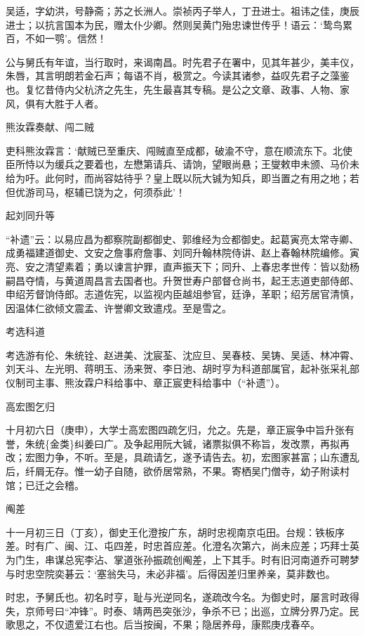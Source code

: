 \documentclass[]{article}
\begin{document}
吴适，字幼洪，号静斋；苏之长洲人。崇祯丙子举人，丁丑进士。祖讳之佳，庚辰进士；以抗言国本为民，赠太仆少卿。然则吴黄门殆忠谏世传乎！语云：`鸷鸟累百，不如一鹗'。信然！

公与舅氏有年谊，当行取时，来谒南昌。时先君子在署中，见其年甚少，美丰仪，朱唇，其言明朗若金石声；每语不肖，极赏之。今读其诸参，益叹先君子之藻鉴也。复忆昔侍内父杭济之先生，先生最喜其专稿。是公之文章、政事、人物、家风，俱有大胜于人者。

熊汝霖奏献、闯二贼

吏科熊汝霖言：`献贼已至重庆、闯贼直至成都，破渝不守，意在顺流东下。北使臣所恃以为缓兵之要着也，左懋第请兵、请饷，望眼尚悬；王燮敕申未颁、马价未给为吁。此何时，而尚容姑待乎？皇上既以阮大铖为知兵，即当置之有用之地；若但优游司马，枢辅已饶为之，何须忝此'！

起刘同升等

``补遗''云：以易应昌为都察院副都御史、郭维经为佥都御史。起葛寅亮太常寺卿、成勇福建道御史、文安之詹事府詹事、刘同升翰林院侍讲、赵上春翰林院编修。寅亮、安之清望素着；勇以谏言护罪，直声振天下；同升、上春忠孝世传：皆以劾杨嗣昌夺情，与黄道周昌言去国者也。升贺世寿户部督仓尚书，起王志道吏部侍郎、申绍芳督饷侍郎。志道佐宪，以监视内臣越俎参官，廷诤，革职；绍芳居官清慎，因温体仁欲倾文震孟、许誉卿文致遣戍。至是雪之。

考选科道

考选游有伦、朱统铨、赵进美、沈宸荃、沈应旦、吴春枝、吴铸、吴适、林冲霄、刘天斗、左光明、蒋明玉、汤来贺、李日池、胡时亨为科道部属官，起补张采礼部仪制司主事、熊汝霖户科给事中、章正宸吏科给事中（``补遗''）。

高宏图乞归

十月初六日（庚申），大学士高宏图四疏乞归，允之。先是，章正宸争中旨升张有誉，朱统\{金类\}纠姜曰广。及争起用阮大铖，诸票拟俱不称旨，发改票，再拟再改；宏图力争，不听。至是，具疏请乞，遂予请告去。初，宏图家甚富；山东遭乱后，纤屑无存。惟一幼子自随，欲侨居常熟，不果。寄栖吴门僧寺，幼子附读村馆；已迁之会稽。

阄差

十一月初三日（丁亥），御史王化澄按广东，胡时忠视南京屯田。台规：铁板序差。时有广、闽、江、屯四差，时忠首应差。化澄名次第六，尚未应差；巧拜士英为门生，串谋总宪李沾、掌道张孙振疏创阄差，上下其手。时有旧河南道乔可聘梦与时忠空院奕碁云：`塞翁失马，未必非福'。后得因差归里养亲，莫非数也。

时忠，予舅氏也。初名时亨，耻与光逆同名，遂疏改今名。为御史时，屡言时政得失，京师号曰``冲锋''。时泰、靖两邑突张沙，争杀不已；出巡，立牌分界乃定。民歌思之，不仅遗爱江右也。后当按闽，不果；隐居养母，康熙庚戌春卒。
\end{document}
